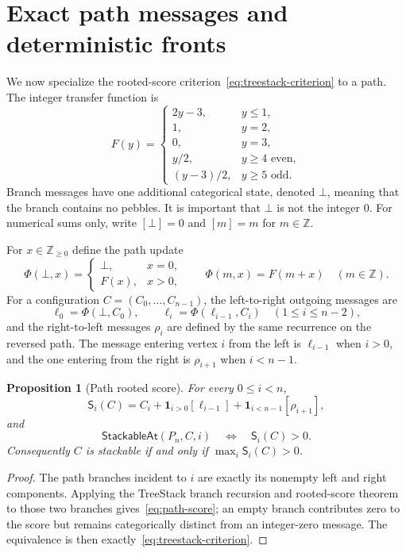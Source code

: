 \documentclass[11pt]{article}
\newtheorem{proposition}[theorem]{Proposition}
\newcommand{\Z}{\mathbb Z}
\newcommand{\EMPTY}{\bot}
\newcommand{\score}{\mathsf S}
\newcommand{\StackableAt}{\mathsf{StackableAt}}
\begin{document}
\section{Exact path messages and deterministic fronts}\label{sec:messages}

We now specialize the rooted-score criterion~\eqref{eq:treestack-criterion} to
a path.  The integer transfer function is
\[
 F(y)=
 \begin{cases}
  2y-3,&y\le1,\\
  1,&y=2,\\
  0,&y=3,\\
  y/2,&y\ge4\text{ even},\\
  (y-3)/2,&y\ge5\text{ odd}.
 \end{cases}
 \tag{3.1}\label{eq:F}
\]
Branch messages have one additional categorical state, denoted $\EMPTY$,
meaning that the branch contains no pebbles.  It is important that
$\EMPTY$ is not the integer $0$.  For numerical sums only, write
$[\EMPTY]=0$ and $[m]=m$ for $m\in\Z$.

For $x\in\Z_{\ge0}$ define the path update
\[
 \Phi(\EMPTY,x)=
 \begin{cases}
 \EMPTY,&x=0,\\
 F(x),&x>0,
 \end{cases}
 \qquad
 \Phi(m,x)=F(m+x)\quad(m\in\Z).
 \tag{3.2}\label{eq:path-step}
\]
For a configuration $C=(C_0,\dots,C_{n-1})$, the left-to-right outgoing
messages are
\[
 \ell_0=\Phi(\EMPTY,C_0),\qquad
 \ell_i=\Phi(\ell_{i-1},C_i)\quad(1\le i\le n-2),
 \tag{3.3}\label{eq:left-scan}
\]
and the right-to-left messages $\rho_i$ are defined by the same recurrence on
the reversed path.  The message entering vertex $i$ from the left is
$\ell_{i-1}$ when $i>0$, and the one entering from the right is $\rho_{i+1}$
when $i<n-1$.

\begin{proposition}[Path rooted score]\label{prop:path-score}
For every $0\le i<n$,
\[
 \score_i(C)
 =C_i+\mathbf1_{i>0}[\ell_{i-1}]
      +\mathbf1_{i<n-1}[\rho_{i+1}],
 \tag{3.4}\label{eq:path-score}
\]
and
\[
 \StackableAt(P_n,C,i)\quad\Longleftrightarrow\quad \score_i(C)>0.
\]
Consequently $C$ is stackable if and only if
$\max_i\score_i(C)>0$.
\end{proposition}

\begin{proof}
The path branches incident to $i$ are exactly its nonempty left and right
components.  Applying the TreeStack branch recursion and rooted-score theorem
to those two branches gives~\eqref{eq:path-score}; an empty branch contributes
zero to the score but remains categorically distinct from an integer-zero
message.  The equivalence is then exactly~\eqref{eq:treestack-criterion}.
\end{proof}
\end{document}
